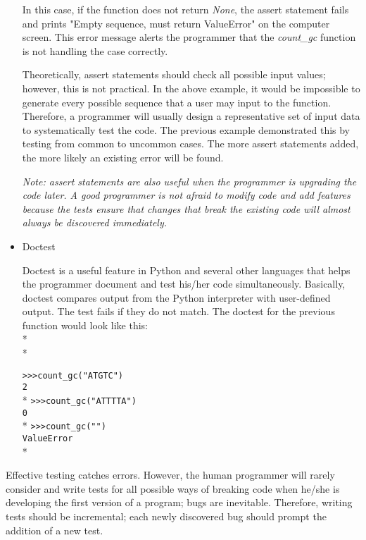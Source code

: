\documentclass[ChapterTOCs,krantz2]{krantz} %
\begin{document}
\begin{itemize}
In this case, if the function does not return \emph{None}, the assert statement
fails and prints "Empty sequence, must return ValueError" on the computer
screen.
This error message alerts the programmer that the \emph{count\_gc} function
is not handling the case correctly.  

Theoretically, assert statements should check all possible input
values; however, this is not practical. In the above example, it
would be impossible to generate every possible sequence that a user may
input to the function.  Therefore, a programmer will usually design
a representative set of input data to systematically test the code.  The
previous example demonstrated this by testing 
from common to uncommon cases.  The more assert statements
added, the more likely an existing error will be found.  

\textsl{Note: assert
statements are also useful 
when the programmer is upgrading the code later.
A good programmer is not afraid to modify code and add features because the
tests ensure that changes that break the existing code will almost always
be discovered immediately.}

\item Doctest

Doctest is a useful feature in Python and several other languages that helps the 
programmer document
and test his/her code simultaneously. Basically, doctest compares output
from the Python interpreter with user-defined output. The test fails if they do
not match. The doctest for the previous function would look like this:\\*\\*

\texttt{>>>count\_gc("ATGTC") \\2}\\*
\texttt{>>>count\_gc("ATTTTA") \\0}\\*
\texttt{>>>count\_gc("")\\ValueError}\\*

\end{itemize}

Effective testing catches errors. However, the human programmer will
rarely consider and write tests for all possible ways of breaking code when
he/she is developing the first version of a program; bugs are inevitable.
Therefore, writing tests should be incremental; each newly discovered bug
should prompt the addition of a new test.
\end{document}
